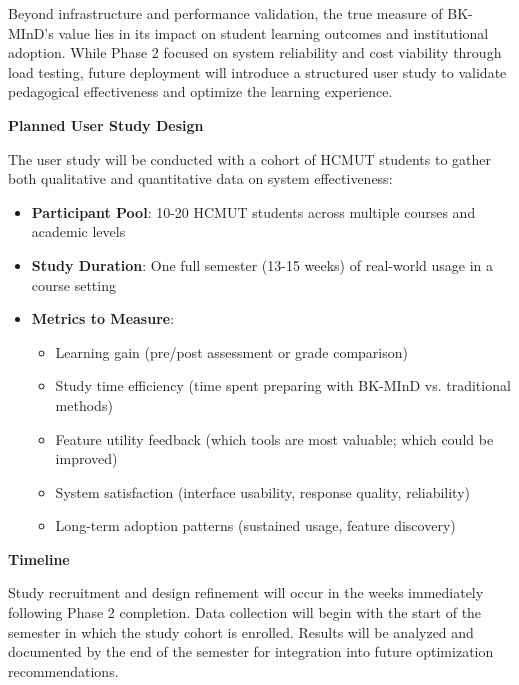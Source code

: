 Beyond infrastructure and performance validation, the true measure of BK-MInD's value lies in its impact on student learning outcomes and institutional adoption. While Phase 2 focused on system reliability and cost viability through load testing, future deployment will introduce a structured user study to validate pedagogical effectiveness and optimize the learning experience.

\textbf{Planned User Study Design}

The user study will be conducted with a cohort of HCMUT students to gather both qualitative and quantitative data on system effectiveness:

\begin{itemize}
    \item \textbf{Participant Pool}: 10-20 HCMUT students across multiple courses and academic levels
    \item \textbf{Study Duration}: One full semester (13-15 weeks) of real-world usage in a course setting
    \item \textbf{Metrics to Measure}:
        \begin{itemize}
            \item Learning gain (pre/post assessment or grade comparison)
            \item Study time efficiency (time spent preparing with BK-MInD vs. traditional methods)
            \item Feature utility feedback (which tools are most valuable; which could be improved)
            \item System satisfaction (interface usability, response quality, reliability)
            \item Long-term adoption patterns (sustained usage, feature discovery)
        \end{itemize}
\end{itemize}



\textbf{Timeline}

Study recruitment and design refinement will occur in the weeks immediately following Phase 2 completion. Data collection will begin with the start of the semester in which the study cohort is enrolled. Results will be analyzed and documented by the end of the semester for integration into future optimization recommendations.

